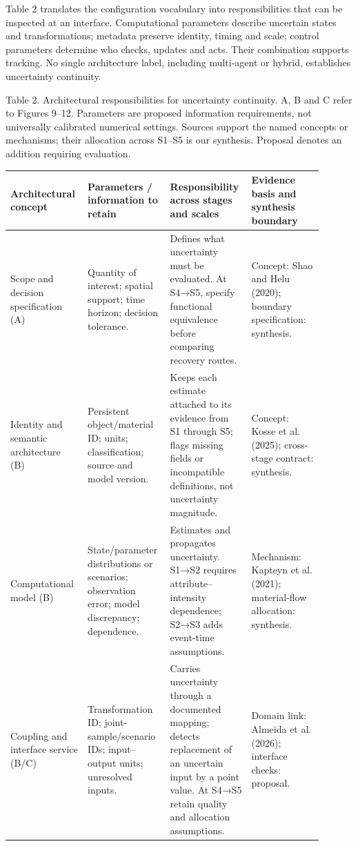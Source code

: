 Table 2 translates the configuration vocabulary into responsibilities that can be inspected at an interface. Computational parameters describe uncertain states and transformations; metadata preserve identity, timing and scale; control parameters determine who checks, updates and acts. Their combination supports tracking. No single architecture label, including multi-agent or hybrid, establishes uncertainty continuity.

Table 2. Architectural responsibilities for uncertainty continuity. A, B and C refer to Figures 9–12. Parameters are proposed information requirements, not universally calibrated numerical settings. Sources support the named concepts or mechanisms; their allocation across S1–S5 is our synthesis. Proposal denotes an addition requiring evaluation.

\begin{longtable}{p{0.225\linewidth}p{0.225\linewidth}p{0.225\linewidth}p{0.225\linewidth}}
\toprule
Architectural concept & Parameters / information to retain & Responsibility across stages and scales & Evidence basis and synthesis boundary\\
\midrule
Scope and decision specification (A) & Quantity of interest; spatial support; time horizon; decision tolerance. & Defines what uncertainty must be evaluated. At S4→S5, specify functional equivalence before comparing recovery routes. & Concept: Shao and Helu (2020); boundary specification: synthesis.\\
Identity and semantic architecture (B) & Persistent object/material ID; units; classification; source and model version. & Keeps each estimate attached to its evidence from S1 through S5; flags missing fields or incompatible definitions, not uncertainty magnitude. & Concept: Kosse et al. (2025); cross-stage contract: synthesis.\\
Computational model (B) & State/parameter distributions or scenarios; observation error; model discrepancy; dependence. & Estimates and propagates uncertainty. S1→S2 requires attribute–intensity dependence; S2→S3 adds event-time assumptions. & Mechanism: Kapteyn et al. (2021); material-flow allocation: synthesis.\\
Coupling and interface service (B/C) & Transformation ID; joint-sample/scenario IDs; input–output units; unresolved inputs. & Carries uncertainty through a documented mapping; detects replacement of an uncertain input by a point value. At S4→S5 retain quality and allocation assumptions. & Domain link: Almeida et al. (2026); interface checks: proposal.\\

\end{longtable}
